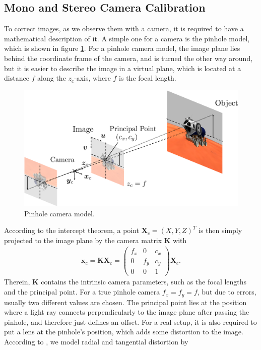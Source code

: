 \subsection{Mono and Stereo Camera Calibration}
To correct images, as we observe them with a camera, it is required to have a mathematical description of it. A simple one for a camera is the pinhole model, which is shown in figure \ref{fig::332_pin_hole_camera}. For a pinhole camera model, the image plane lies behind the coordinate frame of the camera, and is turned the other way around, but it is easier to describe the image in a virtual plane, which is located at a distance $f$ along the $z_c$-axis, where $f$ is the focal length.
\begin{figure}[h!]
	\centering
	\includegraphics[scale=.28]{chapters/03_principles_of_machine_learning/img/pin_hole_camera.png}
	\caption{Pinhole camera model.}
	\label{fig::332_pin_hole_camera}
\end{figure}
According to the intercept theorem, a point $\bm{X}_c = (X,Y,Z)^T$ is then simply projected to the image plane by the camera matrix $\bm{K}$ with
\begin{align}
	\bm{x}_c = \bm{K}\bm{X}_c = \begin{pmatrix}
	f_x & 0   & c_x \\
	0   & f_y & c_y \\
	0   & 0   & 1
	\end{pmatrix}\bm{X}_c.
	\label{eq::332_focal_intrinsics}
\end{align}
Therein, $\bm{K}$ contains the intrinsic camera parameters, such as the focal lengths and the principal point. For a true pinhole camera $f_x = f_y =f$, but due to errors, usually two different values are chosen. The principal point lies at the position where a light ray connects perpendicularly to the image plane after passing the pinhole, and therefore just defines an offset. For a real setup, it is also required to put a lens at the pinhole's position, which adds some distortion to the image. According to \cite{duane1971close}, we model radial and tangential distortion by
